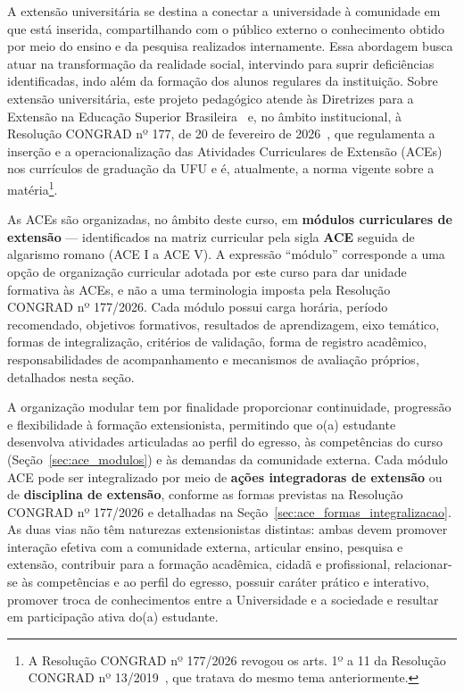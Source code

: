 A extensão universitária se destina a conectar a universidade à comunidade em que está inserida, compartilhando com o público externo o conhecimento obtido por meio do ensino e da pesquisa realizados internamente. Essa abordagem busca atuar na transformação da realidade social, intervindo para suprir deficiências identificadas, indo além da formação dos alunos regulares da instituição. Sobre extensão universitária, este projeto pedagógico atende às Diretrizes para a Extensão na Educação Superior Brasileira~\cite{cne_ces_7_2018} e, no âmbito institucional, à Resolução CONGRAD nº 177, de 20 de fevereiro de 2026~\cite{ufu_congrad_177_2026}, que regulamenta a inserção e a operacionalização das Atividades Curriculares de Extensão (ACEs) nos currículos de graduação da UFU e é, atualmente, a norma vigente sobre a matéria\footnote{A Resolução CONGRAD nº 177/2026 revogou os arts. 1º a 11 da Resolução CONGRAD nº 13/2019~\cite{ufu_congrad_13_2019}, que tratava do mesmo tema anteriormente.}.

As ACEs são organizadas, no âmbito deste curso, em \textbf{módulos curriculares de extensão} — identificados na matriz curricular pela sigla \textbf{ACE} seguida de algarismo romano (ACE I a ACE V). A expressão ``módulo'' corresponde a uma opção de organização curricular adotada por este curso para dar unidade formativa às ACEs, e não a uma terminologia imposta pela Resolução CONGRAD nº 177/2026. Cada módulo possui carga horária, período recomendado, objetivos formativos, resultados de aprendizagem, eixo temático, formas de integralização, critérios de validação, forma de registro acadêmico, responsabilidades de acompanhamento e mecanismos de avaliação próprios, detalhados nesta seção.

A organização modular tem por finalidade proporcionar continuidade, progressão e flexibilidade à formação extensionista, permitindo que o(a) estudante desenvolva atividades articuladas ao perfil do egresso, às competências do curso (Seção~\ref{sec:ace_modulos}\unskip) e às demandas da comunidade externa. Cada módulo ACE pode ser integralizado por meio de \textbf{ações integradoras de extensão} ou de \textbf{disciplina de extensão}, conforme as formas previstas na Resolução CONGRAD nº 177/2026 e detalhadas na Seção~\ref{sec:ace_formas_integralizacao}. As duas vias não têm naturezas extensionistas distintas: ambas devem promover interação efetiva com a comunidade externa, articular ensino, pesquisa e extensão, contribuir para a formação acadêmica, cidadã e profissional, relacionar-se às competências e ao perfil do egresso, possuir caráter prático e interativo, promover troca de conhecimentos entre a Universidade e a sociedade e resultar em participação ativa do(a) estudante.


